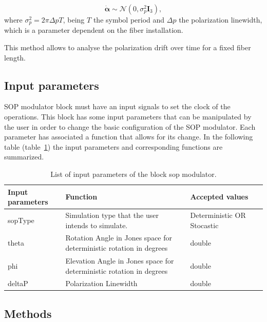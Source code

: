 \begin{refsection}
  \begin{equation}\label{eq:alpha}
    \pmb{\dot{\alpha}} \sim \mathcal{N}(0,\sigma_p^2\textbf{I}_3),
  \end{equation}
  where $\sigma_p^2=2\pi \Delta p T$, being $T$ the symbol period and $\Delta p$ the polarization linewidth, which is a parameter dependent on the fiber installation.

  This method allows to analyse the polarization drift over time for a fixed fiber length.


\subsection*{Input parameters}

SOP modulator block must have an input signals to set the clock of the operations. This block has some input parameters that can be manipulated by the user in order to change the basic configuration of the SOP modulator. Each parameter has associated a function that allows for its change. In the following table (table~\ref{table}) the input parameters and corresponding functions are summarized.

\begin{table}[h]
	\begin{center}
		\begin{tabular}{| m{} | m{} |  m{} | m{4cm} | }
			\hline
			\textbf{Input parameters} & \textbf{Function} & \textbf{Accepted values} \\ \hline
			sopType                  & Simulation type that the user intends to simulate. & Deterministic OR Stocastic\\
            theta                       & Rotation Angle in Jones space for deterministic rotation in degrees & double \\
            phi                         & Elevation Angle in Jones space for deterministic rotation in degrees & double \\
            deltaP                      & Polarization Linewidth & double \\
			\hline
		\end{tabular}
		\caption{List of input parameters of the block sop modulator.} \label{table}
	\end{center}
\end{table}


\subsection*{Methods}


\end{refsection}
